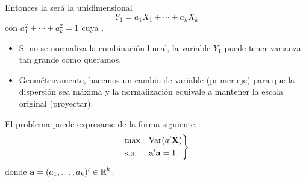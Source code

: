 Entonces la  será la \va unidimensional \[ Y_1=a_1X_1+\cdots+a_kX_k \] con $a_1^2+\cdots+a_k^2=1$ cuya .
\begin{itemize}
	\item Si no se normaliza la combinación lineal, la variable $Y_1$ puede tener varianza tan grande como queramos.
	\item Geométricamente, hacemos un cambio de variable (primer eje) para que la dispersión sea máxima y la normalización equivale a mantener la escala original (proyectar).
\end{itemize}
El problema puede expresarse de la forma siguiente: \[ \begin{rcases}
	\max&\operatorname{Var}(a'\mathbf{X})\\
	\text{s.a.} & \mathbf{a'a}=1
\end{rcases} \] donde $\mathbf{a}=(a_1,\dots,a_k)'\in\operatorname{\mathbb{R}}^k$.

